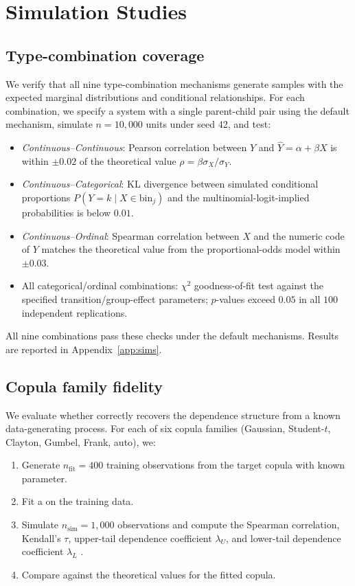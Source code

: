 \documentclass[article]{jss}
\begin{document}
\section{Simulation Studies}
\label{sec:sims}

\subsection{Type-combination coverage}

We verify that all nine type-combination mechanisms generate samples with the expected marginal distributions and conditional relationships. For each combination, we specify a system with a single parent-child pair using the default mechanism, simulate $n = 10{,}000$ units under seed 42, and test:

\begin{itemize}
  \item \emph{Continuous--Continuous}: Pearson correlation between $Y$ and $\hat{Y} = \alpha + \beta X$ is within $\pm 0.02$ of the theoretical value $\rho = \beta \sigma_X / \sigma_Y$.
  \item \emph{Continuous--Categorical}: KL divergence between simulated conditional proportions $P(Y = k \mid X \in \text{bin}_j)$ and the multinomial-logit-implied probabilities is below $0.01$.
  \item \emph{Continuous--Ordinal}: Spearman correlation between $X$ and the numeric code of $Y$ matches the theoretical value from the proportional-odds model within $\pm 0.03$.
  \item All categorical/ordinal combinations: $\chi^2$ goodness-of-fit test against the specified transition/group-effect parameters; $p$-values exceed $0.05$ in all $100$ independent replications.
\end{itemize}

All nine combinations pass these checks under the default mechanisms. Results are reported in Appendix~\ref{app:sims}.

\subsection{Copula family fidelity}

We evaluate whether  correctly recovers the dependence structure from a known data-generating process. For each of six copula families (Gaussian, Student-$t$, Clayton, Gumbel, Frank, auto), we:

\begin{enumerate}
  \item Generate $n_{\text{fit}} = 400$ training observations from the target copula with known parameter.
  \item Fit a  on the training data.
  \item Simulate $n_{\text{sim}} = 1{,}000$ observations and compute the Spearman correlation, Kendall's $\tau$, upper-tail dependence coefficient $\lambda_U$, and lower-tail dependence coefficient $\lambda_L$ \citep{joe2014dependence}.
  \item Compare against the theoretical values for the fitted copula.
\end{enumerate}
\end{document}
